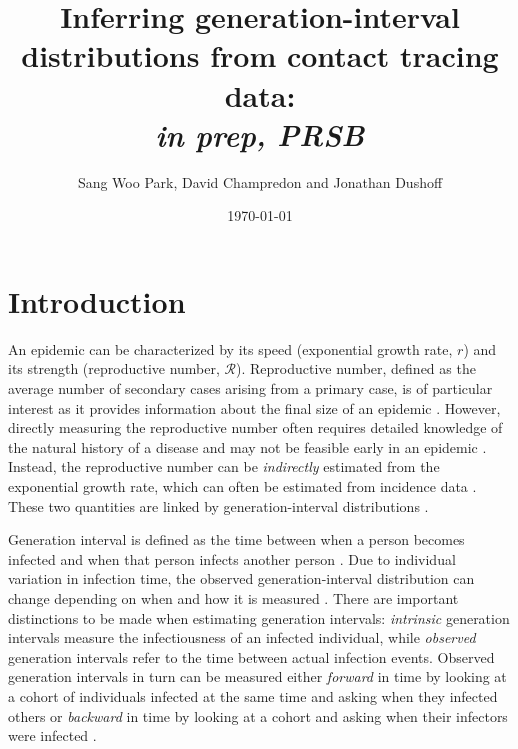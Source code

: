 \documentclass[12pt]{article}
\title{Inferring generation-interval distributions from contact tracing data: \\ \emph{in prep, PRSB}}
\author{Sang Woo Park, David Champredon and Jonathan Dushoff}
\date{\today}
\newcommand{\RR}{\ensuremath{{\mathcal R}}}
\begin{document}
\maketitle

\section{Introduction}


An epidemic can be characterized by its speed (exponential growth rate, $r$) and its strength (reproductive number, \RR).
Reproductive number, defined as the average number of secondary cases arising from a primary case, is of particular interest as it provides information about the final size of an epidemic \citep{anderson1991infectious, diekmann1990definition}.
However, directly measuring the reproductive number often requires detailed knowledge of the natural history of a disease and may not be feasible early in an epidemic \citep{dietz1993estimation}.
Instead, the reproductive number can be \emph{indirectly} estimated from the exponential growth rate, which can often be estimated from incidence data \citep{chowell2003sars, mills2004transmissibility, nishiura2009transmission, nishiura2010pros, ma2014estimating}.
These two quantities are linked by generation-interval distributions \citep{wearing2005appropriate, svensson2007note, roberts2007model, wallinga2007generation, park2019practical}.

Generation interval is defined as the time between when a person becomes infected and when that person infects another person \citep{svensson2007note}.
Due to individual variation in infection time, the observed generation-interval distribution can change depending on when and how it is measured \citep{svensson2007note, kenah2008generation, nishiura2010time, champredon2015intrinsic}.
There are important distinctions to be made when estimating generation intervals: \emph{intrinsic} generation intervals measure the infectiousness of an infected individual,
while \emph{observed} generation intervals refer to the time between actual infection events.
Observed generation intervals in turn can be measured either \emph{forward} in time by looking at a cohort of individuals infected at the same time and asking when they infected others or \emph{backward} in time by looking at a cohort and asking when their infectors were infected \citep{champredon2015intrinsic}.
\end{document}
